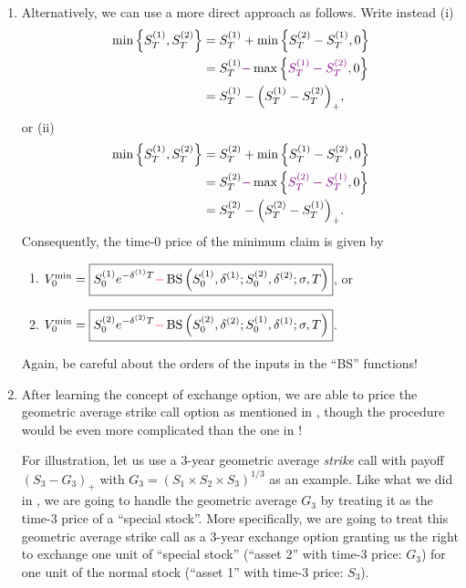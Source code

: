 \begin{enumerate}
\item \label{it:min-claim-dir-fmlas} Alternatively, we can use a more direct
approach as follows. Write instead (i)
\begin{align*}
\min\qty{S_T^{(1)},S_T^{(2)}}&=S_T^{(1)}+\min\qty{S_T^{(2)}-S_T^{(1)},0} \\
&=S_T^{(1)}{\color{violet}-}\max\qty{{\color{violet}S_T^{(1)}-S_T^{(2)}},0} \\
&=S_T^{(1)}-\qty(S_T^{(1)}-S_T^{(2)})_{+},
\end{align*}
or (ii)
\begin{align*}
\min\qty{S_T^{(1)},S_T^{(2)}}&=S_T^{(2)}+\min\qty{S_T^{(1)}-S_T^{(2)},0} \\
&=S_T^{(2)}{\color{violet}-}\max\qty{{\color{violet}S_T^{(2)}-S_T^{(1)}},0} \\
&=S_T^{(2)}-\qty(S_T^{(2)}-S_T^{(1)})_{+}.
\end{align*}
Consequently, the time-0 price of the minimum claim is given by
\begin{enumerate}[label={(\roman*)}]
\item \(V_0^{\mathrm{min}}=\boxed{S_0^{(1)}e^{-\delta^{(1)}T}{\color{red}-}\operatorname{BS}\qty(S_0^{(1)},\delta^{(1)};S_0^{(2)},\delta^{(2)};\sigma,T)}\), or
\item \(V_0^{\mathrm{min}}=\boxed{S_0^{(2)}e^{-\delta^{(2)}T}{\color{red}-}\operatorname{BS}\qty(S_0^{(2)},\delta^{(2)};S_0^{(1)},\delta^{(1)};\sigma,T)}\).
\end{enumerate}
\begin{warning}
Again, be careful about the orders of the inputs in the ``BS'' functions!
\end{warning}

\item \label{it:bs-geo-avg-strike} After learning the concept of exchange
option, we are able to price the geometric average strike call option as
mentioned in , though the procedure would be
even more complicated than the one in !

For illustration, let us use a 3-year geometric average \emph{strike} call with payoff
\((S_3-G_3)_{+}\) with \(G_3=(S_1\times S_2\times S_3)^{1/3}\) as an example.
Like what we did in , we are going to handle the
geometric average \(G_3\) by treating it as the time-3 price of a ``special
stock''. More specifically, we are going to treat this geometric average strike
call as a 3-year exchange option granting us the right to exchange one unit of
``special stock'' (``asset 2'' with time-3 price: \(G_3\)) for one unit of the
normal stock (``asset 1'' with time-3 price: \(S_3\)).


\end{enumerate}
